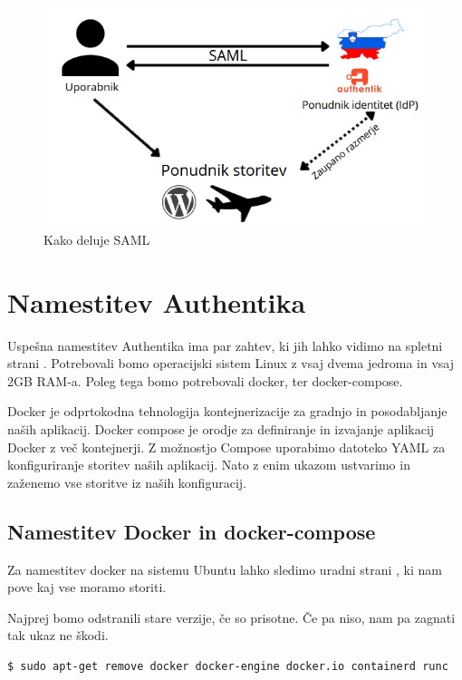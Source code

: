 \documentclass[a4paper,12pt,openright]{book}
\begin{document}
{\begin{figure}[H]
\includegraphics[scale=0.7]{diploma-FRI-vzorec_11maj2021/SAML.jpg}
\caption{Kako deluje SAML}
\label{fig:grafMoj}
\end{figure}

 \section{Namestitev Authentika}

Uspešna namestitev Authentika ima par zahtev, ki jih lahko vidimo na spletni strani \cite{AuthentikLink}.
Potrebovali bomo operacijski sistem Linux z vsaj dvema jedroma in vsaj 2GB RAM-a. Poleg tega bomo potrebovali docker, ter docker-compose. 

Docker je odprtokodna tehnologija kontejnerizacije za gradnjo in posodabljanje naših aplikacij.
Docker compose je orodje za definiranje in izvajanje aplikacij Docker z več kontejnerji. Z možnostjo Compose uporabimo datoteko YAML za konfiguriranje storitev naših aplikacij. Nato z enim ukazom ustvarimo in zaženemo vse storitve iz naših konfiguracij.
\subsection{Namestitev Docker in docker-compose}

Za namestitev docker na sistemu Ubuntu lahko sledimo uradni strani \cite{DockerLink}, ki nam pove kaj vse moramo storiti. 

Najprej bomo odstranili stare verzije, če so prisotne. Če pa niso, nam pa zagnati tak ukaz ne škodi.


\begin{lstlisting}[language=bash]
 $ sudo apt-get remove docker docker-engine docker.io containerd runc
\end{lstlisting}

}
\end{document}

